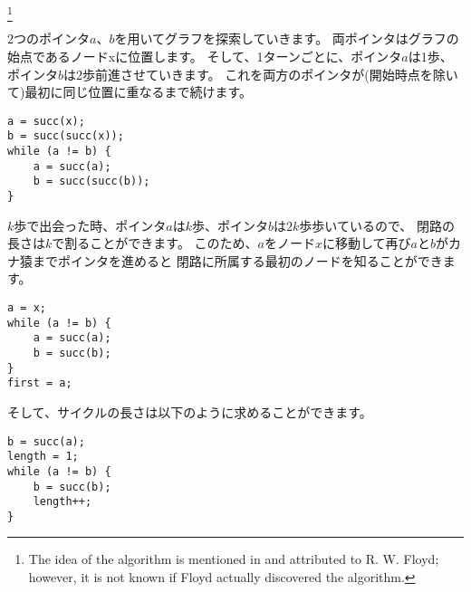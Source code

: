 
\footnote{The idea of the algorithm is mentioned in \cite{knu982}
and attributed to R. W. Floyd; however, it is not known if Floyd actually
discovered the algorithm.}

2つのポインタ$a$、$b$を用いてグラフを探索していきます。
両ポインタはグラフの始点であるノードxに位置します。
そして、1ターンごとに、ポインタ$a$は1歩、ポインタ$b$は2歩前進させていきます。
これを両方のポインタが(開始時点を除いて)最初に同じ位置に重なるまで続けます。

\begin{lstlisting}
a = succ(x);
b = succ(succ(x));
while (a != b) {
    a = succ(a);
    b = succ(succ(b));
}
\end{lstlisting}


$k$歩で出会った時、ポインタ$a$は$k$歩、ポインタ$b$は$2k$歩歩いているので、
閉路の長さは$k$で割ることができます。
このため、$a$をノード$x$に移動して再び$a$と$b$がカナ猿までポインタを進めると
閉路に所属する最初のノードを知ることができます。

\begin{lstlisting}
a = x;
while (a != b) {
    a = succ(a);
    b = succ(b);
}
first = a;
\end{lstlisting}

そして、サイクルの長さは以下のように求めることができます。

\begin{lstlisting}
b = succ(a);
length = 1;
while (a != b) {
    b = succ(b);
    length++;
}
\end{lstlisting}
